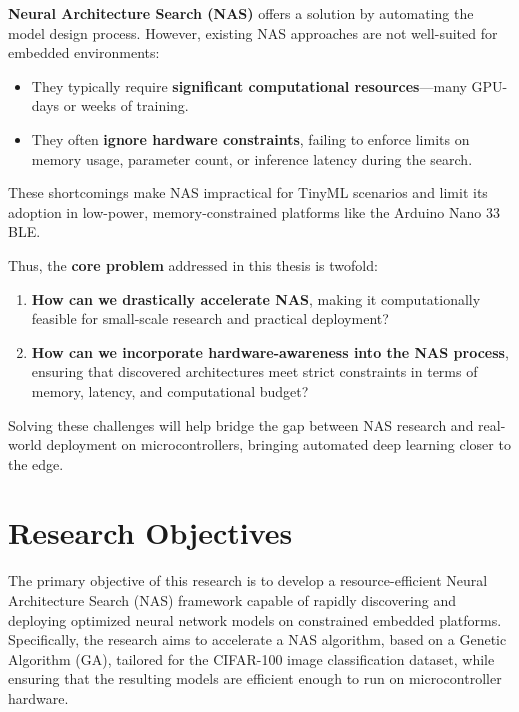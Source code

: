 \textbf{Neural Architecture Search (NAS)} offers a solution by automating the model design process. However, existing NAS approaches are not well-suited for embedded environments:
\begin{itemize}
    \item They typically require \textbf{significant computational resources}—many GPU-days or weeks of training.
    \item They often \textbf{ignore hardware constraints}, failing to enforce limits on memory usage, parameter count, or inference latency during the search.
\end{itemize}

These shortcomings make NAS impractical for TinyML scenarios and limit its adoption in low-power, memory-constrained platforms like the Arduino Nano 33 BLE.

Thus, the \textbf{core problem} addressed in this thesis is twofold:

\begin{enumerate}
    \item \textbf{How can we drastically accelerate NAS}, making it computationally feasible for small-scale research and practical deployment?
    \item \textbf{How can we incorporate hardware-awareness into the NAS process}, ensuring that discovered architectures meet strict constraints in terms of memory, latency, and computational budget?
\end{enumerate}

Solving these challenges will help bridge the gap between NAS research and real-world deployment on microcontrollers, bringing automated deep learning closer to the edge.








\section{Research Objectives}

The primary objective of this research is to develop a resource-efficient Neural Architecture Search (NAS) framework capable of rapidly discovering and deploying optimized neural network models on constrained embedded platforms. Specifically, the research aims to accelerate a NAS algorithm, based on a Genetic Algorithm (GA), tailored for the CIFAR-100 image classification dataset, while ensuring that the resulting models are efficient enough to run on microcontroller hardware.

